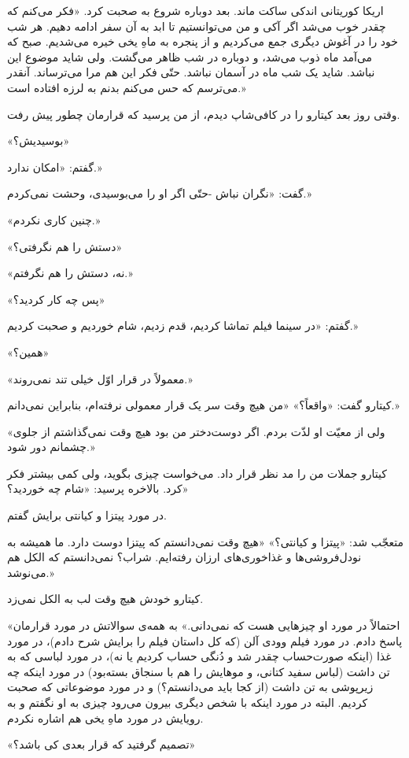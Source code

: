 \documentclass[a5paper]{book}
\begin{document}
اریکا کوریتانی اندکی ساکت ماند. بعد دوباره شروع به صحبت کرد. «فکر می‌کنم که چقدر خوب می‌شد اگر آکی و من می‌توانستیم تا ابد به آن سفر ادامه دهیم. هر شب خود را در آغوش دیگری جمع می‌کردیم و از پنجره به ماهِ یخی خیره می‌شدیم. صبح که می‌آمد ماه ذوب می‌شد، و دوباره در شب ظاهر می‌گشت. ولی شاید موضوع این نباشد. شاید یک شب ماه در آسمان نباشد. حتّی فکر این هم مرا می‌ترساند. آنقدر می‌ترسم که حس می‌کنم بدنم به لرزه افتاده ‌است.»

وقتی روز بعد کیتارو را در کافی‌شاپ دیدم، از من پرسید که قرارمان چطور پیش رفت.

«بوسیدیش؟»

گفتم: «امکان ندارد.»

گفت: «نگران نباش -حتّی اگر او را می‌بوسیدی، وحشت نمی‌کردم.»

«چنین کاری نکردم.»

«دستش را هم نگرفتی؟»

«نه، دستش را هم نگرفتم.»

«پس چه کار کردید؟»

گفتم: «در سینما فیلم تماشا کردیم، قدم زدیم، شام خوردیم و صحبت کردیم.»

«همین؟»

«معمولاً در قرار اوّل خیلی تند نمی‌روند.»

کیتارو گفت: «واقعاً؟» «من هیچ وقت سر یک قرار معمولی نرفته‌ام، بنابراین نمی‌دانم.»

«ولی از معیّت او لذّت بردم. اگر دوست‌دختر من بود هیچ وقت نمی‌گذاشتم از جلوی چشمانم دور شود.»

کیتارو جملات من را مد نظر قرار داد. می‌خواست چیزی بگوید، ولی کمی بیشتر فکر کرد. بالاخره پرسید: «شام چه خوردید؟»

در مورد پیتزا و کیانتی برایش گفتم.

متعجّب شد: «پیتزا و کیانتی؟» «هیچ وقت نمی‌دانستم که پیتزا دوست دارد. ما همیشه به نودل‌فروشی‌ها و غذاخوری‌های ارزان رفته‌ایم. شراب؟ نمی‌دانستم که الکل هم می‌نوشد.»

کیتارو خودش هیچ وقت لب به الکل نمی‌زد.

«احتمالاً در مورد او چیزهایی هست که نمی‌دانی.» به همه‌ی سوالاتش در مورد قرارمان پاسخ دادم. در مورد فیلم وودی آلن (که کل داستان فیلم را برایش شرح دادم)، در مورد غذا (اینکه صورت‌حساب چقدر شد و دُنگی حساب کردیم یا نه)، در مورد لباسی که به تن داشت (لباس سفید کتانی، و موهایش را هم با سنجاق بسته‌بود) در مورد اینکه چه زیرپوشی به تن داشت (از کجا باید می‌دانستم؟) و در مورد موضوعاتی که صحبت کردیم. البته در مورد اینکه با شخص دیگری بیرون می‌رود چیزی به او نگفتم و به رویایش در مورد ماهِ یخی هم اشاره نکردم.

«تصمیم گرفتید که قرار بعدی کی باشد؟»
\end{document}
